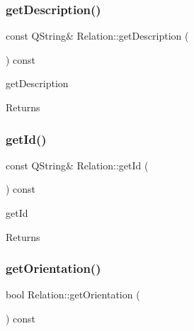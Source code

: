 \subsubsection{\texorpdfstring{get\+Description()}{getDescription()}}
{\footnotesize\ttfamily const Q\+String\& Relation\+::get\+Description (\begin{DoxyParamCaption}{ }\end{DoxyParamCaption}) const\hspace{0.3cm}{\ttfamily [inline]}}



get\+Description 

\begin{DoxyReturn}{Returns}

\end{DoxyReturn}
\mbox{\label{class_relation_a928c6b7afd86cbba6c7510e7495aa943}} 
\subsubsection{\texorpdfstring{get\+Id()}{getId()}}
{\footnotesize\ttfamily const Q\+String\& Relation\+::get\+Id (\begin{DoxyParamCaption}{ }\end{DoxyParamCaption}) const\hspace{0.3cm}{\ttfamily [inline]}}



get\+Id 

\begin{DoxyReturn}{Returns}

\end{DoxyReturn}
\mbox{\label{class_relation_a77b7d698e607457ef5b14ded5d0e6f7f}} 
\subsubsection{\texorpdfstring{get\+Orientation()}{getOrientation()}}
{\footnotesize\ttfamily bool Relation\+::get\+Orientation (\begin{DoxyParamCaption}{ }\end{DoxyParamCaption}) const\hspace{0.3cm}{\ttfamily [inline]}}



